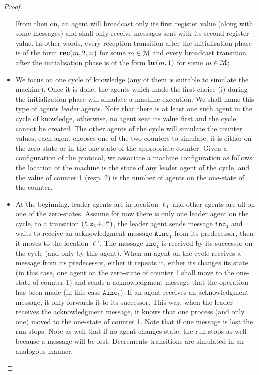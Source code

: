 \begin{proof}
\begin{itemize}
		From then on, an agent will broadcast only its first register value (along with some messages) and shall only receive messages sent with its second register value. In other words, every reception transition after the initialisation phase is of the form $\textbf{rec}(m, 2, =)$ for some $m \in \mathcal{M}$ and every broadcast transition after the initialisation  phase is of the form $\textbf{br}(m, 1)$ for some $m \in \mathcal{M}$;
		
		\item We focus on one cycle of knowledge (any of them is suitable to simulate the machine). Once it is done, the agents which made the first choice (i) during the initialization phase will simulate a machine execution. We shall name this type of agents \emph{leader} agents. Note that there is at least one such agent in the cycle of knowledge, otherwise, no agent sent its value first and the cycle cannot be created. 
		The other agents of the cycle will simulate the counter values, each agent chooses one of the two counters to simulate, it is either on the zero-state or in the one-state of the appropriate counter. Given a configuration of the protocol, we associate a machine configuration as follows: the location of the machine is the state of any leader agent of the cycle, and the value of counter 1 (resp. 2) is the number of agents on the one-state of the counter.
		
		\item At the beginning, leader agents are in location $\ell_0$ and other agents are all on one of the zero-states. Assume for now there is only one leader agent on the cycle, to a transition $(\ell, \mathtt{\mathtt{x}_1}+, \ell')$, the leader agent sends message $\mathtt{inc_1}$ and waits to receive an acknowledgment message $\mathtt{Ainc_1}$ from its predecessor, then it moves to the location $\ell'$. The message $\mathtt{inc_1}$ is received by its successor on the cycle (and only by this agent). When an agent on the cycle receives a message from its predecessor, either it repeats it, either its changes its state (in this case, one agent on the zero-state of counter 1 shall move to the one-state of counter 1) and sends a acknowledgment message that the operation has been made (in this case $\mathtt{Ainc_1}$). If an agent receives an acknowledgment message, it only forwards it to its successor. This way, when the leader receives the acknowledgment message, it knows that one process (and only one) moved to the one-state of counter 1. Note that if one message is lost the run stops. Note as well that if no agent changes state, the run stops as well because a message will be lost. Decrements transitions are simulated in an analogous manner.
		

\end{itemize}
\end{proof}
